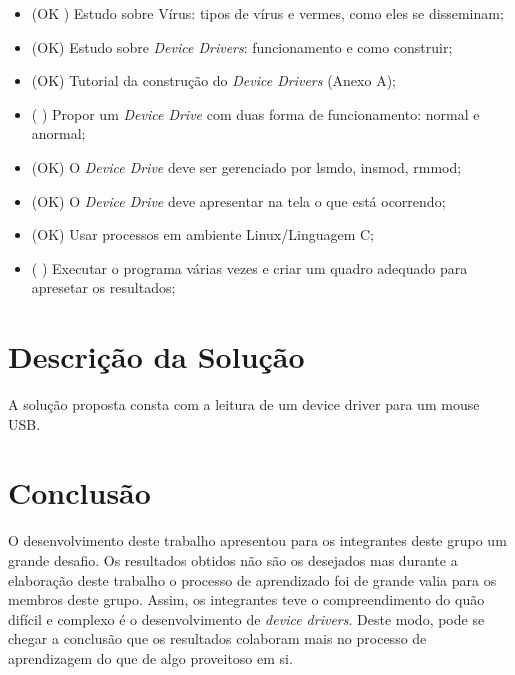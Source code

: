 \begin{itemize}
  \item (OK ) Estudo sobre Vírus: tipos de vírus e vermes, como eles se disseminam;
  \item (OK) Estudo sobre \textit{Device Drivers}: funcionamento e como construir;
  \item (OK) Tutorial da construção do \textit{Device Drivers} (Anexo A);
  \item (  ) Propor um \textit{Device Drive} com duas forma de funcionamento: normal e anormal;
  \item (OK) O \textit{Device Drive} deve ser gerenciado por lsmdo, insmod, rmmod;
  \item (OK) O \textit{Device Drive} deve apresentar na tela o que está ocorrendo;
  \item (OK) Usar processos em ambiente Linux/Linguagem C;
  \item (  ) Executar o programa várias vezes e criar um quadro adequado para apresetar os resultados;
\end{itemize}

\section{Descrição da Solução}

A solução proposta consta com a leitura de um device driver para um mouse USB.


\section{Conclusão}
O desenvolvimento deste trabalho apresentou para os integrantes deste grupo um grande desafio. Os resultados obtidos não são os desejados
mas durante a elaboração deste trabalho o processo de aprendizado foi de grande valia para os membros deste grupo. Assim, os integrantes teve o compreendimento
do quão difícil e complexo é o desenvolvimento de \textit{device drivers}. Deste modo, pode se chegar a conclusão que os resultados colaboram mais no processo de aprendizagem do que de algo proveitoso em si. 



